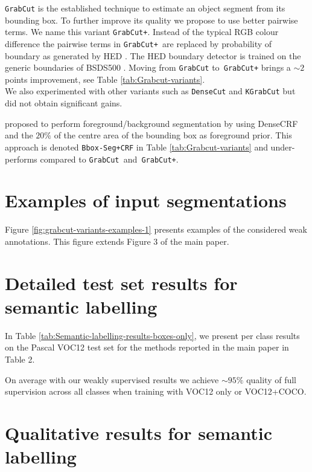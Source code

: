 \documentclass[10pt,english,british,twocolumn]{article}
\begin{document}
\texttt{GrabCut} \cite{Rother2004TogGrabcut} is the established technique
to estimate an object segment from its bounding box. To further improve
its quality we propose to use better pairwise terms. We name this
variant \texttt{GrabCut+}. Instead of the typical RGB colour difference
the pairwise terms in \texttt{GrabCut+ }are replaced by probability
of boundary as generated by HED \cite{Xie2015Iccv}. The HED boundary
detector is trained on the generic boundaries of BSDS500 \cite{ArbelaezMaireFowlkesMalikPAMI11}.
Moving from \texttt{GrabCut} to\texttt{ GrabCut+} brings a $\sim2$
points improvement, see Table \ref{tab:Grabcut-variants}.\\
We also experimented with other variants such as \texttt{DenseCut}
\cite{Cheng2015CgfDenseCut} and \texttt{KGrabCut} \cite{Tang2015IccvSecretGrabCut}
but did not obtain significant gains.

\cite{Papandreou2015Iccv} proposed to perform foreground/background
segmentation by using DenseCRF and the $20\%$ of the centre area
of the bounding box as foreground prior. This approach is denoted
\texttt{Bbox-Seg+CRF} in Table \ref{tab:Grabcut-variants} and under-performs
compared to \texttt{GrabCut }and\texttt{ GrabCut+}. 

\section{\label{sec:Examples-of-input}Examples of input segmentations}

Figure \ref{fig:grabcut-variants-examples-1} presents examples of
the considered weak annotations. This figure extends Figure 3 of the
main paper.

\section{\label{sec:Quantitative-results-for}Detailed test set results for
semantic labelling}

In Table \ref{tab:Semantic-labelling-results-boxes-only}, we present
per class results on the Pascal VOC12 test set for the methods reported
in the main paper in Table 2.

On average with our weakly supervised results we achieve $\sim95\%$
quality of full supervision across all classes when training with
VOC12 only or VOC12+COCO.

\section{\label{sec:Qualitative-results-for}Qualitative results for semantic
labelling}
\end{document}

